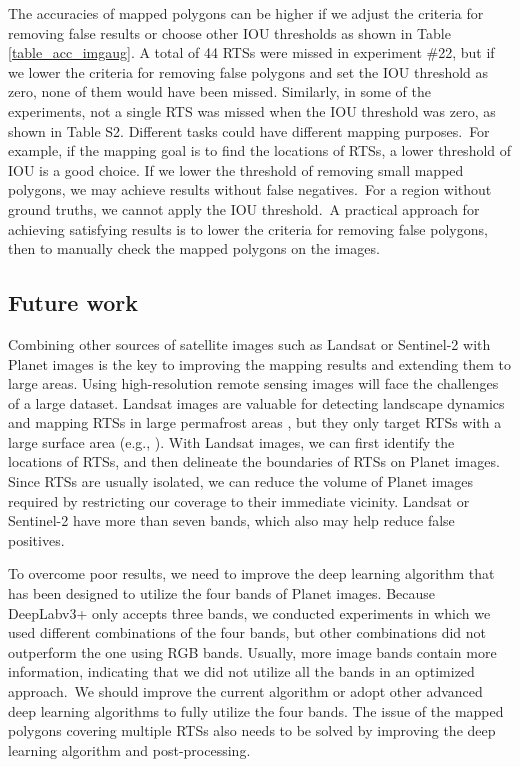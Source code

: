 \documentclass[authoryear,preprint,review,12pt]{elsarticle}
\begin{document}
The accuracies of mapped polygons can be higher if we adjust the criteria for removing false results or choose other IOU thresholds as shown in Table \ref{table_acc_imgaug}. 
A total of 44 RTSs were missed in experiment \#22, but if we lower the criteria for removing false polygons and set the IOU threshold as zero, none of them would have been missed. Similarly, in some of the experiments, not a single RTS was missed when the IOU threshold was zero, as shown in Table S2. Different tasks could have different mapping purposes.~For example, if the mapping goal is to find the locations of RTSs, a lower threshold of IOU is a good choice. If we lower the threshold of removing small mapped polygons, we may achieve results without false negatives.~For a region without ground truths, we cannot apply the IOU threshold.~A practical approach for achieving satisfying results is to lower the criteria for removing false polygons, then to manually check the mapped polygons on the images. 


\subsection{Future work}
\label{subsec_future}

Combining other sources of satellite images such as Landsat or Sentinel-2 with Planet images is the key to improving the mapping results and extending them to large areas. Using high-resolution remote sensing images will face the challenges of a large dataset. Landsat images are valuable for detecting landscape dynamics and mapping RTSs in large permafrost areas \citep{nitze_detection_2016, nitze_landsat-based_2017, nitze2018remote}, but they 
only target RTSs with a large surface area (e.g., \citealp{brooker2014investigating}). With Landsat images, we can first identify the locations of RTSs, and then delineate the boundaries of RTSs on Planet images. Since RTSs are usually isolated, we can reduce the volume of Planet images required by restricting our coverage to their immediate vicinity.
Landsat or Sentinel-2 have more than seven bands, which also may help reduce false positives. 

To overcome poor results, we need to improve the deep learning algorithm that has been designed to utilize the four bands of Planet images. Because DeepLabv3+ only accepts three bands, we conducted experiments in which we used different combinations of the four bands, but other combinations did not outperform the one using RGB bands. Usually, more image bands contain more information, indicating that we did not utilize all the bands in an optimized approach.~We should improve the current algorithm or adopt other advanced deep learning algorithms to fully utilize the four bands.
The issue of the mapped polygons covering multiple RTSs also needs to be solved by improving the deep learning algorithm and post-processing. 
\end{document}
